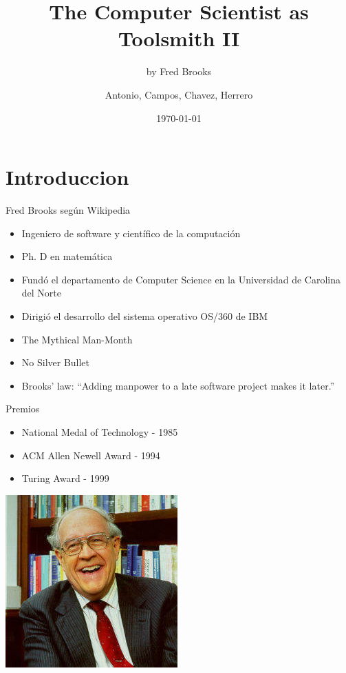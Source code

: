 \documentclass{beamer}
\title{The Computer Scientist as Toolsmith II}
\subtitle{by Fred Brooks}
\author{Antonio, Campos, Chavez, Herrero}
\institute{Ingeniería de Software II}
\date{\today}
\begin{document}
\begin{frame}
\titlepage
\end{frame}

\section{Introduccion}
\begin{frame}{Fred Brooks según Wikipedia}

\begin{itemize}
\item Ingeniero de software y científico de la computación 
\item Ph. D en matemática
\item Fundó el departamento de Computer Science en la Universidad de Carolina del Norte
\item Dirigió el desarrollo del sistema operativo OS/360 de IBM
\item The Mythical Man-Month
\item No Silver Bullet
\item Brooks' law: ``Adding manpower to a late software project makes it later.''
\end{itemize}
\end{frame}

\begin{frame}{Premios}
\begin{itemize}
\item National Medal of Technology - 1985
\item ACM Allen Newell Award - 1994
\item Turing Award - 1999
\end{itemize}
\begin{center}
\includegraphics[height=.50\textheight]{Brooks.jpg}
\end{center}
\end{frame}
\end{document}
